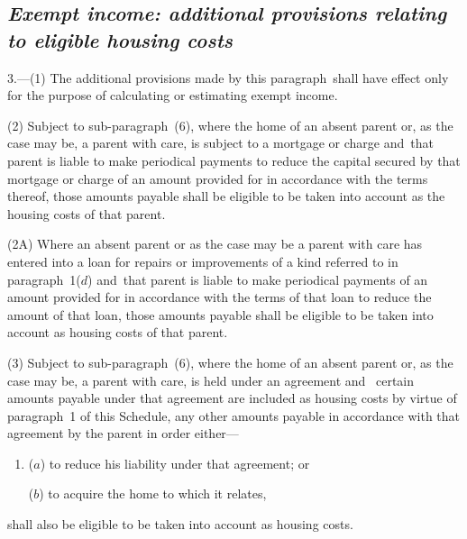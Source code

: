 \documentclass[12pt,a4paper]{article}
\begin{document}

\subsection*{\sloppy\itshape Exempt income: additional provisions relating to eligible housing costs}

3.—(1) The additional provisions made by this paragraph~shall have effect only for the purpose of calculating or estimating exempt income.

(2) Subject to sub-paragraph~(6), where the home of an absent parent or, as the case may be, a parent with care, is subject to a mortgage or charge and~that parent 
is liable to make periodical payments  %
to reduce the capital secured by that mortgage or charge of an amount provided for in accordance with the terms thereof, 
those amounts payable  %
shall be eligible to be taken into account as the housing costs of that parent.

(2A) Where an absent parent or as the case may be a parent with care has entered into a loan for repairs or improvements of a kind referred to in paragraph~1($d$) and~that parent 
is liable to make periodical payments  %
of an amount provided for in accordance with the terms of that loan to reduce the amount of that loan, 
those amounts payable  %
shall be eligible to be taken into account as housing costs of that parent.

(3) Subject to sub-paragraph~(6), where the home of an absent parent or, as the case may be, a parent with care, is held under an agreement and~
certain amounts payable  %
under that agreement are included as housing costs by virtue of paragraph~1 of this Schedule, 
any other amounts payable  %
in accordance with that agreement by the parent in order either—
\begin{enumerate}\item[]
($a$) to reduce his liability under that agreement; or

($b$) to acquire the home to which it relates,
\end{enumerate}
shall also be eligible to be taken into account as housing costs.
\end{document}
